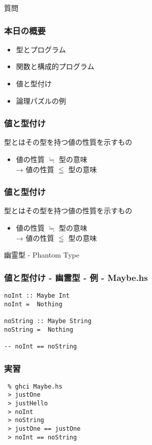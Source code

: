\documentclass[cjk,dvipdfm,14pt]{beamer}
\begin{document}
\begin{frame}[fragile]
質問
\end{frame}

\begin{frame}[fragile]
\frametitle{本日の概要}

\begin{itemize}
\item 型とプログラム
\item 関数と構成的プログラム
\item { \color{red} 値と型付け }
\item 論理パズルの例
\end{itemize}

\end{frame}

\begin{frame}[fragile]
\frametitle{値と型付け}

型とはその型を持つ値の性質を示すもの
\begin{itemize}
\item 値の性質 $\fallingdotseq $ 型の意味\\
 → { \color{red} 値の性質 $\leqq $ 型の意味 }
\end{itemize}

\end{frame}

\begin{frame}[fragile]
\frametitle{値と型付け}

型とはその型を持つ値の性質を示すもの
\begin{itemize}
\item 値の性質 $\fallingdotseq $ 型の意味\\
 → 値の性質 $\leqq $ 型の意味
\end{itemize}
{ \color{red} 幽霊型 - Phantom Type }

\end{frame}

\begin{frame}[fragile]
\frametitle{値と型付け - 幽霊型 - 例 - Maybe.hs}

\begin{lstlisting}
noInt :: Maybe Int
noInt =  Nothing

noString :: Maybe String
noString =  Nothing

-- noInt == noString
\end{lstlisting}

\end{frame}

\begin{frame}[fragile]
\frametitle{実習}

\begin{lstlisting}
 % ghci Maybe.hs
 > justOne
 > justHello
 > noInt
 > noString
 > justOne == justOne
 > noInt == noString
\end{lstlisting}

\end{frame}
\end{document}
